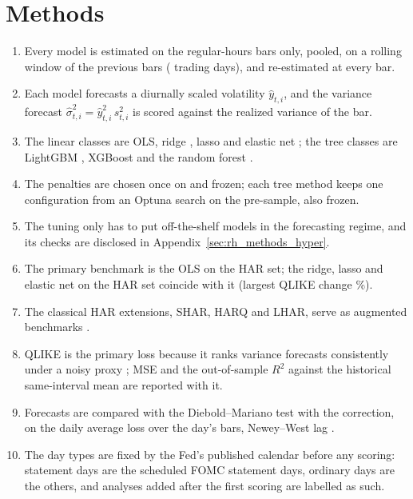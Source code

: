 \section{Methods}
\label{sec:rh_methods}\label{sec:rh_methods_tests}\label{sec:rh_results_eval}

\begin{enumerate}
\item Every model is estimated on the \rhorNBars{} regular-hours bars only, pooled, on a rolling window of the previous
  \rhorWindowBars{} bars (\rhorWindowDays{} trading days), and re-estimated at every bar.
\item Each model forecasts a diurnally scaled volatility $\hat y_{t,i}$, and the variance forecast
  $\hat\sigma^2_{t,i} = \hat y^{2}_{t,i}\, s^2_{t,i}$ is scored against the realized variance of the bar.
\item The linear classes are OLS, ridge \citep{HoerlKennard1970}, lasso \citep{Tibshirani1996} and elastic net
  \citep{ZouHastie2005}; the tree classes are LightGBM \citep{Ke2017}, XGBoost \citep{Chen2016} and the random forest
  \citep{Breiman2001}.
\item The penalties are chosen once on \rhorPenSample{} and frozen; each tree method keeps one configuration from an
  Optuna search \citep{Akiba2019} on the \rhtuTreeSearchSpan{} pre-sample, also frozen.
\item The tuning only has to put off-the-shelf models in the forecasting regime, and its checks are disclosed in
  Appendix~\ref{sec:rh_methods_hyper}.
\item The primary benchmark is the OLS on the HAR set; the ridge, lasso and elastic net on the HAR set coincide with it
  (largest QLIKE change \rhorVsOlsPctLinHarMaxAbs\%).
\item The classical HAR extensions, SHAR, HARQ and LHAR, serve as augmented benchmarks
  \citep{PattonSheppard2015,BollerslevPattonQuaedvlieg2016,CorsiReno2012}.
\item QLIKE is the primary loss because it ranks variance forecasts consistently under a noisy proxy
  \citep{Patton2011}; MSE and the out-of-sample $R^2$ against the historical same-interval mean
  \citep{CampbellThompson2008} are reported with it.
\item Forecasts are compared with the Diebold--Mariano test \citep{DieboldMariano1995} with the
  \citet{HarveyLeybourneNewbold1997} correction, on the daily average loss over the day's bars, Newey--West lag
  \rhorHacLag.
\item The day types are fixed by the Fed's published calendar before any scoring: statement days are the scheduled FOMC
  statement days, ordinary days are the others, and analyses added after the first scoring are labelled as such.
\end{enumerate}

